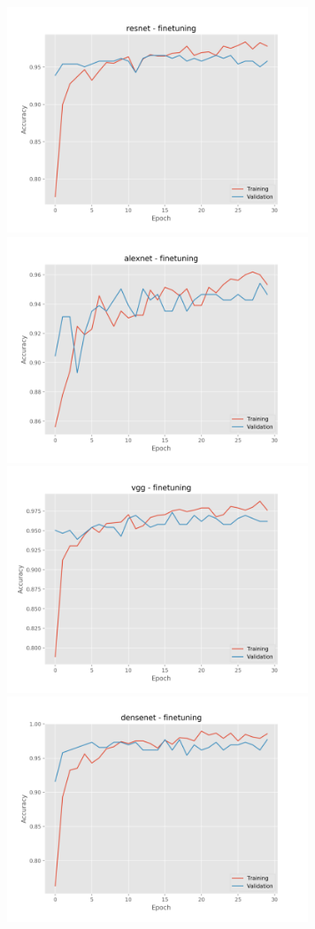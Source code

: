 \documentclass[]{kththesis}
\begin{document}
  \begin{figure}[h]
    \includegraphics[width=9cm]{b_a_resnet_fine}
    \includegraphics[width=9cm]{b_a_alexnet_fine}
    \includegraphics[width=9cm]{b_a_vgg_fine}
    \includegraphics[width=9cm]{b_a_densenet_fine}

\end{figure}
\end{document}
